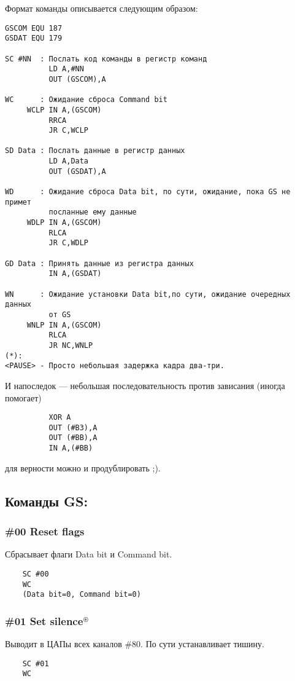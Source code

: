 \documentclass[a4paper,11pt]{article}
\DeclareRobustCommand{\Cyrax}{\texorpdfstring{\(^\circledast\)}{\circledast}}
\begin{document}
\begin{minipage}{\textwidth}
Формат команды описывается следующим образом:
\begin{verbatim}
GSCOM EQU 187
GSDAT EQU 179

SC #NN  : Послать код команды в регистр команд
          LD A,#NN
          OUT (GSCOM),A

WC      : Ожидание сброса Command bit
     WCLP IN A,(GSCOM)
          RRCA
          JR C,WCLP

SD Data : Послать данные в регистр данных
          LD A,Data
          OUT (GSDAT),A

WD      : Ожидание сброса Data bit, по сути, ожидание, пока GS не примет
          посланные ему данные
     WDLP IN A,(GSCOM)
          RLCA
          JR C,WDLP

GD Data : Принять данные из регистра данных
          IN A,(GSDAT)

WN      : Ожидание установки Data bit,по сути, ожидание очередных данных
          от GS
     WNLP IN A,(GSCOM)
          RLCA
          JR NC,WNLP
(*):
<PAUSE> - Просто небольшая задержка кадра два-три.
\end{verbatim}
\end{minipage}

И напоследок — небольшая последовательность против зависания (иногда помогает)
\begin{verbatim}
          XOR A
          OUT (#B3),A
          OUT (#BB),A
          IN A,(#BB)
\end{verbatim}
для верности можно и продублировать ;).

\subsection{Команды GS:}

\subsubsection{\#00 Reset flags}
Сбрасывает флаги Data bit и Command bit.
\begin{verbatim}
    SC #00
    WC
    (Data bit=0, Command bit=0)
\end{verbatim}

\subsubsection{\#01 Set silence\Cyrax\label{cmd:01}}
Выводит в ЦАПы всех каналов \#80. По сути устанавливает тишину.
\begin{verbatim}
    SC #01
    WC
\end{verbatim}
\end{document}

